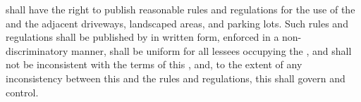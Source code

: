 \lessor shall have the right to publish reasonable rules and regulations for the use of the \commonAreas and the adjacent driveways, landscaped areas, and parking lots. Such rules and regulations shall be published by \lessor in written form, enforced in a non-discriminatory manner, shall be uniform for all lessees occupying the \building, and shall not be inconsistent with the terms of this \lease, and, to the extent of any inconsistency between this \lease and the rules and regulations, this \lease shall govern and control.
